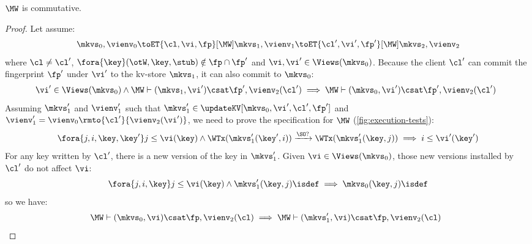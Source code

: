 \begin{lemma}
    \label{lem:mw-comm}
    \(\MW\) is commutative.
\end{lemma}
\begin{proof}
    Let assume:
    \[
        \mkvs_0, \vienv_0 \toET{\cl, \vi, \fp}[\MW] \mkvs_1, \vienv_1 \toET{\cl', \vi', \fp'}[\MW] \mkvs_2, \vienv_2 
    \]
    where \( \cl \neq \cl' \), \( \fora{ \key } (\otW, \key, \stub) \notin \fp \cap \fp' \) and \( \vi, \vi' \in \Views(\mkvs_0)\).
    Because the client \( \cl' \) can commit the fingerprint \( \fp' \) under \( \vi' \) to the kv-store \( \mkvs_1 \), it can also commit to \( \mkvs_0 \):
    \[
        \begin{array}{@{}l}
            \vi' \in \Views(\mkvs_0) \land \MW \vdash (\mkvs_1, \vi') \csat \fp', \vienv_2(\cl') \implies  \MW \vdash (\mkvs_0, \vi') \csat \fp', \vienv_2(\cl')
        \end{array}
    \]
    Assuming \( \mkvs'_1 \) and \( \vienv'_1 \) such that \( \mkvs'_1 \in \updateKV[\mkvs_0,\vi',\cl',\fp'] \) and \( \vienv'_1 = \vienv_0\rmto{\cl'}{\vienv_2(\vi')} \), we need to prove the specification for \( \MW \) (\cref{fig:execution-tests}):
    \[
        \fora{j,i, \key, \key'} j \leq \vi(\key) \wedge \WTx(\mkvs'_1(\key', i)) \xrightarrow{\SO ?} \WTx(\mkvs'_1(\key, j)) \implies i \leq \vi'(\key')  \\
    \]
    For any key written by \( \cl' \), there is a new version of the key in \( \mkvs'_1 \).
    Given \( \vi \in \Views(\mkvs_0)\), those new versions installed by \( \cl' \) do not affect \( \vi \):
    \[
        \fora{j,i, \key} j \leq \vi(\key) \land \mkvs'_1(\key, j)\isdef \implies \mkvs_0(\key, j)\isdef
    \]
    so we have:
    \[
        \begin{array}{@{}l}
            \MW \vdash (\mkvs_0, \vi) \csat \fp, \vienv_2(\cl) \implies  \MW \vdash (\mkvs'_1, \vi) \csat \fp, \vienv_2(\cl)
        \end{array}
    \]
\end{proof}


